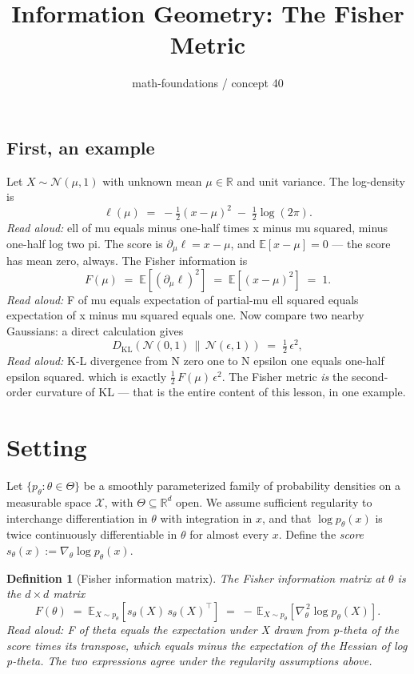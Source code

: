\documentclass[11pt]{article}
\title{Information Geometry: The Fisher Metric}
\author{math-foundations / concept 40}
\date{}
\newtheorem{definition}{Definition}
\begin{document}
\maketitle

\subsection*{First, an example}

Let $X \sim \mathcal{N}(\mu, 1)$ with unknown mean $\mu \in \mathbb{R}$ and unit variance.
The log-density is
\[
\ell(\mu) \;=\; -\tfrac{1}{2}(x - \mu)^2 \;-\; \tfrac{1}{2}\log(2\pi).
\]
\emph{Read aloud:} ell of mu equals minus one-half times x minus mu squared, minus one-half log two pi.
The score is $\partial_\mu \ell = x - \mu$, and $\mathbb{E}[x - \mu] = 0$ — the score has mean zero,
always. The Fisher information is
\[
F(\mu) \;=\; \mathbb{E}\!\left[(\partial_\mu \ell)^2\right] \;=\; \mathbb{E}[(x-\mu)^2] \;=\; 1.
\]
\emph{Read aloud:} F of mu equals expectation of partial-mu ell squared equals expectation of x minus mu squared equals one.
Now compare two nearby Gaussians: a direct calculation gives
\[
D_{\mathrm{KL}}\!\left(\mathcal{N}(0,1) \,\|\, \mathcal{N}(\epsilon, 1)\right) \;=\; \tfrac{1}{2}\,\epsilon^2,
\]
\emph{Read aloud:} K-L divergence from N zero one to N epsilon one equals one-half epsilon squared.
which is exactly $\tfrac{1}{2}\, F(\mu)\, \epsilon^2$. The Fisher metric \emph{is} the
second-order curvature of KL — that is the entire content of this lesson, in one example.

\section{Setting}

Let $\{p_\theta : \theta \in \Theta\}$ be a smoothly parameterized family of
probability densities on a measurable space $\mathcal{X}$, with
$\Theta \subseteq \mathbb{R}^d$ open. We assume sufficient regularity to
interchange differentiation in $\theta$ with integration in $x$, and that
$\log p_\theta(x)$ is twice continuously differentiable in $\theta$ for almost
every $x$. Define the \emph{score} $s_\theta(x) := \nabla_\theta \log p_\theta(x)$.

\begin{definition}[Fisher information matrix]
The Fisher information matrix at $\theta$ is the $d \times d$ matrix
\[
F(\theta)
  \;=\; \mathbb{E}_{X \sim p_\theta}\!\left[s_\theta(X)\, s_\theta(X)^\top\right]
  \;=\; -\,\mathbb{E}_{X \sim p_\theta}\!\left[\nabla_\theta^{\,2} \log p_\theta(X)\right].
\]
\emph{Read aloud:} F of theta equals the expectation under X drawn from p-theta of the score times its transpose, which equals minus the expectation of the Hessian of log p-theta.
The two expressions agree under the regularity assumptions above.
\end{definition}
\end{document}
